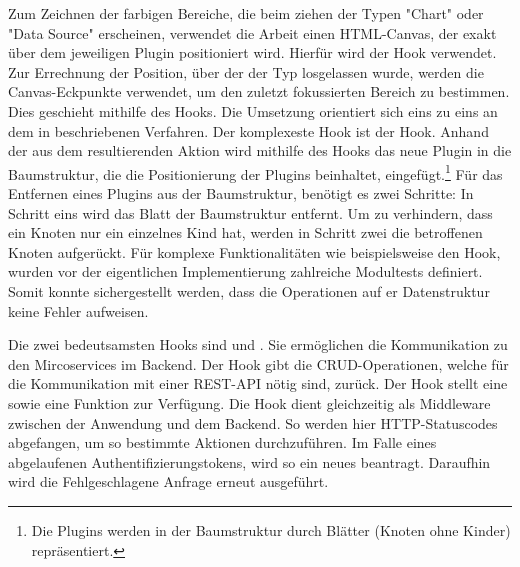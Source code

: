 Zum Zeichnen der farbigen Bereiche, die beim ziehen der Typen "Chart" oder "Data Source" erscheinen,
verwendet die Arbeit einen HTML-Canvas, der exakt über dem jeweiligen Plugin positioniert wird.
Hierfür wird der  Hook verwendet. Zur Errechnung der Position, über der der Typ
losgelassen wurde, werden die Canvas-Eckpunkte verwendet, um den zuletzt fokussierten Bereich zu bestimmen.
Dies geschieht mithilfe des  Hooks. Die Umsetzung orientiert sich eins zu eins an dem
in  beschriebenen Verfahren. Der komplexeste Hook ist der
 Hook. Anhand der aus dem  resultierenden Aktion wird
mithilfe des  Hooks das neue Plugin in die Baumstruktur, die die Positionierung
der Plugins beinhaltet, eingefügt.\footnote{Die Plugins werden in der Baumstruktur durch Blätter (Knoten ohne Kinder) repräsentiert.}
Für das Entfernen eines Plugins aus der Baumstruktur, benötigt es zwei Schritte: In Schritt eins wird
das Blatt der Baumstruktur entfernt. Um zu verhindern, dass ein Knoten nur ein einzelnes Kind hat,
werden in Schritt zwei die betroffenen Knoten aufgerückt. Für komplexe Funktionalitäten wie beispielsweise
den  Hook, wurden vor der eigentlichen Implementierung zahlreiche Modultests definiert.
Somit konnte sichergestellt werden, dass die Operationen auf er Datenstruktur keine Fehler aufweisen.

Die zwei bedeutsamsten Hooks sind  und . Sie ermöglichen
die Kommunikation zu den Mircoservices im Backend. Der  Hook gibt die CRUD-Operationen,
welche für die Kommunikation mit einer REST-API nötig sind, zurück. Der  Hook
stellt eine  sowie eine  Funktion zur Verfügung. Die  Hook
dient gleichzeitig als Middleware zwischen der Anwendung und dem Backend. So werden hier HTTP-Statuscodes
abgefangen, um so bestimmte Aktionen durchzuführen. Im Falle eines abgelaufenen Authentifizierungstokens,
wird so ein neues beantragt. Daraufhin wird die Fehlgeschlagene Anfrage erneut ausgeführt.


